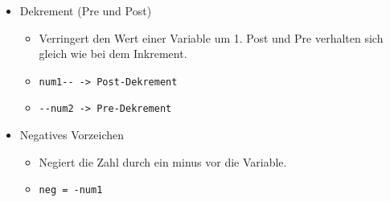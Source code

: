 \documentclass{article}
\begin{document}
\begin{itemize}
\begin{itemize}
		\end{itemize}
		\item{Dekrement (Pre und Post)}
		\begin{itemize}
			\item{Verringert den Wert einer Variable um 1. Post und Pre verhalten sich gleich wie bei dem Inkrement.}
			\item{\verb|num1-- -> Post-Dekrement|}
			\item{\verb|--num2 -> Pre-Dekrement|}
		\end{itemize}
		\item{Negatives Vorzeichen}
		\begin{itemize}
			\item{Negiert die Zahl durch ein minus vor die Variable.}
			\item{\verb|neg = -num1|}
		\end{itemize}
	\end{itemize}
\end{document}
